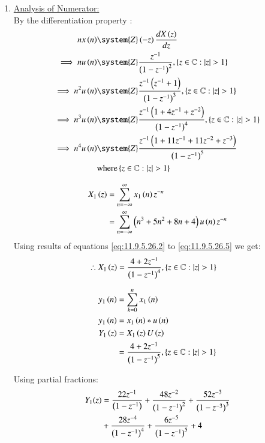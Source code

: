 \documentclass[journal,12pt,twocolumn]{IEEEtran}
\theoremstyle{remark}
\begin{document}
\begin{enumerate}[label=\arabic*.]
\item \underline {Analysis of Numerator:}\\


By the differentiation property :
\begin{align}
 n x\brak{n} & \system{Z} \brak{-z} \frac{dX\brak{z}}{dz} \label{eq:11.9.5.26.1}\\
\implies    n u\brak{n} & \system{Z} \frac{z^{-1}}{\brak{1-z^{-1}}^2} ,\cbrak{z\in\mathbb{C} : \lvert z \rvert > 1} \label{eq:11.9.5.26.2}\\
\implies     n^2 u\brak{n} & \system{Z} \frac{z^{-1}\brak{z^{-1}+1}}{\brak{1-z^{-1}}^3} ,\cbrak{z\in\mathbb{C} : \lvert z \rvert > 1\label{eq:11.9.5.26.3}} \\
\implies     n^3 u\brak{n} & \system{Z} \frac{z^{-1}\brak{1+4z^{-1}+z^{-2}}}{\brak{1-z^{-1}}^4} ,\cbrak{z\in\mathbb{C} : \lvert z \rvert > 1}\label{eq:11.9.5.26.4} \\
\implies   n^4 u\brak{n} & \system{Z} \frac{z^{-1}\brak{1+11z^{-1}+11z^{-2}+z^{-3}}}{\brak{1-z^{-1}}^5}\label{eq:11.9.5.26.5}\\ &  \text{where} \cbrak{z\in\mathbb{C} :\lvert z \rvert > 1} \notag 
\end{align}

\begin{align}
 X_1\left(z\right) &= \sum_{n=-\infty}^\infty x_1\left(n\right)  z^{-n}\\
             &= \sum_{n=-\infty}^\infty \left(n^{3} + 5n^{2} + 8n + 4\right) u\left(n\right) z^{-n}
\end{align}
Using results of equations \eqref{eq:11.9.5.26.2} to \eqref{eq:11.9.5.26.5} we get:
\begin{align}
 \therefore   X_1\left(z\right)&= \frac{4+2z^{-1}}{\left(1-z^{-1}\right)^4} ,\left\{z\in\mathbb{C} : \lvert z \rvert > 1\right\} 
\end{align}

\begin{align}
y_1\left(n\right) &= \sum_{k=0}^n x_1\left(n\right) \\
y_1\left(n\right) &= x_1\left(n\right)\ast u\left(n\right)\\
    Y_1\left(z\right) &= X_1\left(z\right) U\left(z\right) \\
 &= \frac{4+2z^{-1}}{\left(1-z^{-1}\right)^5} ,\left\{z\in\mathbb{C} : \lvert z \rvert > 1\right\} 
\end{align}

Using partial fractions:
\begin{align}
    Y_1(z) &= \frac{22z^{-1}}{\left(1-z^{-1}\right)} + \frac{48z^{-2}}{\left(1-z^{-1}\right)^2} + \frac{52z^{-3}}{\left(1-z^{-3}\right)^3} \label{eq:11.9.5.26.6}\\
    &+ \frac{28z^{-4}}{\left(1-z^{-1}\right)^4}+\frac{6z^{-5}}{\left(1-z^{-1}\right)^5}+4 \notag 
\end{align}


\end{enumerate}
\end{document}
